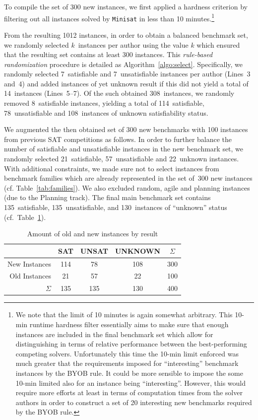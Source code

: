 \documentclass{elsarticle}
\newcommand{\solver}[1]{\texttt{#1}}
\begin{document}
To compile the set of 300 new instances, we first applied a hardness criterion by filtering out all instances solved by \solver{Minisat} in less than 10 minutes.\footnote{We note that
the limit of 10 minutes is again somewhat arbitrary.
This 10-min runtime hardness filter essentially aims to make sure that enough instances are included in the final benchmark set which allow for distinguishing in terms of relative performance between the best-performing competing solvers.
Unfortunately this time the 10-min limit enforced  was much greater that the requirements imposed for  ``interesting'' benchmark instances
by the BYOB rule. It could be more sensible to impose the some 10-min limited also for an instance being ``interesting''. However, this would require more efforts
at least in terms of computation times from the solver authors in order to construct a set of 20 interesting new benchmarks required by the BYOB rule.}

From the resulting 1012 instances, in order to obtain a balanced benchmark set, 
we randomly selected $k$~instances per author using the value  $k$ which ensured that  the resulting set contains at least 300 instances.
This \emph{rule-based randomization} procedure is detailed as
Algorithm~\ref{algo:select}. Specifically,
we randomly selected 7~satisfiable and 7~unsatisfiable instances per author (Lines~3 and~4) and added instances of yet unknown result if this did not yield a total of 14~instances (Lines~5--7). 
Of the such obtained 308~instances, we randomly removed 8~satisfiable instances, yielding a total of 114~satisfiable, 78~unsatisfiable and 108~instances of unknown satisfiability
status.
 
We augmented the then obtained set of 300 new benchmarks with 100 instances from previous SAT competitions as follows. 
In order to further balance the number of satisfiable and unsatisfiable instances in the new benchmark set, we randomly selected 21~satisfiable, 57~unsatisfiable and 22~unknown instances. 
With additional constraints, we made sure not to select instances from benchmark 
families which are already represented in the set of~300 new instances (cf. Table~\ref{tab:families}). 
We also excluded random, agile and planning instances (due to the Planning track). 
The final main benchmark set  contains 135~satisfiable, 135~unsatisfiable, and 130~instances of ``unknown'' status (cf.~Table~\ref{tab:final}). 


\begin{table}[t]
\centering\small
\begin{tabular}{rcccc}
 & SAT & UNSAT & UNKNOWN & $\Sigma$\\
\hline\arrayrulecolor{lightgray}
New Instances & 114 & 78 & 108 & 300 \\
Old Instances & 21 & 57 & 22 & 100\\
\hline
$\Sigma$ & 135 & 135 & 130 & 400
\end{tabular}
\caption{Amount of old and new instances by result}
\label{tab:final}
\end{table}
\end{document}
